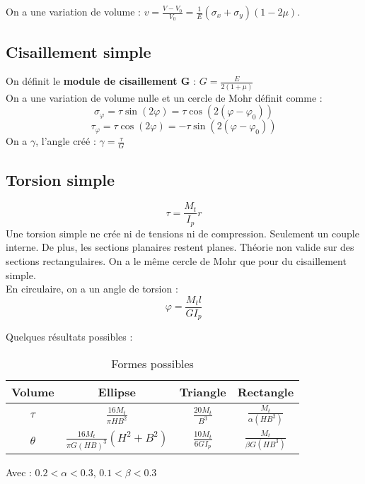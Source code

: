 \documentclass[../main.tex]{subfiles}
\begin{document}
On a une variation de volume : $v = \frac{V-V_0}{V_0} = \frac{1}{E}(\sigma_x + \sigma_y)(1-2\mu)$.\\

\subsection{Cisaillement simple}
On définit le \textbf{module de cisaillement G} : $G = \frac{E}{2(1+\mu)}$\\
On a une variation de volume nulle et un cercle de Mohr définit comme :\\

\begin{equation}
    \sigma_{\varphi} = \tau \sin(2\varphi) = \tau \cos(2(\varphi-\varphi_0))
\end{equation}
\begin{equation}
    \tau_{\varphi} = \tau \cos(2\varphi) = -\tau \sin(2(\varphi-\varphi_0))
\end{equation}
On a $\gamma$, l'angle créé : $\gamma = \frac{\tau}{G}$\\

\subsection{Torsion simple}
\begin{equation}
    \tau = \frac{M_t}{I_p}r
\end{equation}
Une torsion simple ne crée ni de tensions ni de compression. Seulement un couple interne. De plus, les sections planaires restent planes. Théorie non valide sur des sections rectangulaires. On a le même cercle de Mohr que pour du cisaillement simple.\\

En circulaire, on a un angle de torsion : \\
\begin{equation}
    \varphi = \frac{M_t l}{G I_p}
\end{equation}

Quelques résultats possibles :\\
\begin{table}[hbt!]
    \centering
    \begin{tabular}{||c|c|c|c|}
    \hline
        Volume & Ellipse & Triangle & Rectangle \\
        \hline
        $\tau$ & $\frac{16 M_t}{\pi HB^2}$ & $\frac{20 M_t}{B^3}$ & $\frac{M_t}{\alpha (HB^2)}$ \\
        $\theta$ & $\frac{16 M_t}{\pi G (HB)^3} (H^2+B^2)$ & $\frac{10 M_t}{6 G I_p}$ & $\frac{M_t}{\beta G (HB^3)}$ \\
        \hline
    \end{tabular}
    \caption{Formes possibles}
\end{table}
Avec : $0.2< \alpha < 0.3$, $0.1 < \beta < 0.3$
\end{document}
